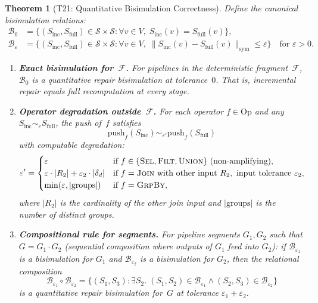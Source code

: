 \documentclass[11pt,a4paper]{article}
\newtheorem{theorem}{Theorem}[section]
\theoremstyle{definition}
\newcommand{\push}{\mathrm{push}}
\newcommand{\Op}{\mathrm{Op}}
\newcommand{\FragF}{\mathcal{F}}
\begin{document}
\begin{theorem}[T21: Quantitative Bisimulation Correctness]%
\label{thm:bisimulation}
Define the canonical bisimulation relations:
\begin{align*}
  \mathcal{B}_0 &= \{(S_{\mathrm{inc}}, S_{\mathrm{full}}) \in
    \mathcal{S} \times \mathcal{S} :
    \forall v \in V,\;
    S_{\mathrm{inc}}(v) = S_{\mathrm{full}}(v)\}, \\[4pt]
  \mathcal{B}_\varepsilon &= \{(S_{\mathrm{inc}}, S_{\mathrm{full}}) \in
    \mathcal{S} \times \mathcal{S} :
    \forall v \in V,\;
    \|S_{\mathrm{inc}}(v) - S_{\mathrm{full}}(v)\|_{\mathrm{sym}}
    \leq \varepsilon\}
    \quad\text{for } \varepsilon > 0.
\end{align*}

\begin{enumerate}[label=(\alph*)]
  \item \textbf{Exact bisimulation for~$\FragF$.}
    For pipelines in the deterministic fragment~$\FragF$,
    $\mathcal{B}_0$ is a quantitative repair bisimulation at tolerance~$0$.
    That is, incremental repair equals full recomputation at every stage.

  \item \textbf{Operator degradation outside~$\FragF$.}
    For each operator $f \in \Op$ and any
    $S_{\mathrm{inc}} \sim_\varepsilon S_{\mathrm{full}}$, the push of~$f$
    satisfies
    \[
      \push_f(S_{\mathrm{inc}}) \sim_{\varepsilon'} \push_f(S_{\mathrm{full}})
    \]
    with computable degradation:
    \begin{equation}\label{eq:degradation}
      \varepsilon' =
      \begin{cases}
        \varepsilon & \text{if } f \in \{\textsc{Sel}, \textsc{Filt},
          \textsc{Union}\} \text{ (non-amplifying)}, \\
        \varepsilon \cdot |R_2| + \varepsilon_2 \cdot |\delta_d|
          & \text{if } f = \textsc{Join} \text{ with other input } R_2,
            \text{ input tolerance } \varepsilon_2, \\
        \min(\varepsilon, |\text{groups}|)
          & \text{if } f = \textsc{GrpBy},
      \end{cases}
    \end{equation}
    where $|R_2|$ is the cardinality of the other join input and
    $|\text{groups}|$ is the number of distinct groups.

  \item \textbf{Compositional rule for segments.}
    For pipeline segments $G_1, G_2$ such that
    $G = G_1 \cdot G_2$ (sequential composition where outputs of $G_1$ feed
    into $G_2$): if $\mathcal{B}_{\varepsilon_1}$ is a bisimulation for $G_1$
    and $\mathcal{B}_{\varepsilon_2}$ is a bisimulation for $G_2$, then the
    relational composition
    \[
      \mathcal{B}_{\varepsilon_1} \circ \mathcal{B}_{\varepsilon_2}
      = \{(S_1, S_3) : \exists S_2.\;
        (S_1, S_2) \in \mathcal{B}_{\varepsilon_1} \wedge
        (S_2, S_3) \in \mathcal{B}_{\varepsilon_2}\}
    \]
    is a quantitative repair bisimulation for~$G$ at tolerance
    $\varepsilon_1 + \varepsilon_2$.
\end{enumerate}
\end{theorem}
\end{document}
